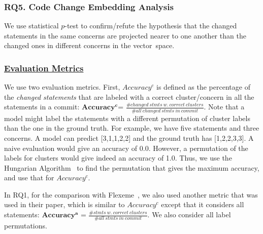 \subsubsection{\bf RQ5. Code Change Embedding Analysis}

We use statistical $p$-test to confirm/refute the hypothesis that the
changed statements in the same concerns are projected nearer to one
another than the changed ones in different concerns in the
vector~space.




\subsubsection*{\underline{Evaluation Metrics}}

We use two evaluation metrics. First, $Accuracy^{c}$ is defined as the
percentage of the {\em changed statements} that are labeled with a
correct cluster/concern in all the statements in a commit:
$\mathbf{Accuracy^{c}}$= $\frac{\#
changed\:stmts\:w.\:correct\:clusters}{\#
all\:changed\:stmts\:in\:commit}$.  Note that a model might label the
statements with a different permutation of cluster labels than the one
in the ground truth. For example, we have five statements and three
concerns. A model can predict [3,1,1,2,2] and the ground truth has
[1,2,2,3,3]. A naive evaluation would give an accuracy of
0.0. However, a permutation of the labels for clusters would give
indeed an accuracy of 1.0. Thus, we use the Hungarian
Algorithm~\cite{hungarian-algo} to find the permutation that gives the
maximum accuracy, and use that for $Accuracy^{c}$.

In RQ1, for the comparison with Flexeme~\cite{flexeme-fse20}, we also
used another metric that was used in their paper, which is similar to
$Accuracy^{c}$ except that it considers all statements: $\mathbf{Accuracy^{a}}$
= $\frac{\# stmts\:w.\:correct\:clusters}{\# all\:stmts\:in\:commit}$.
We also consider all label permutations.



